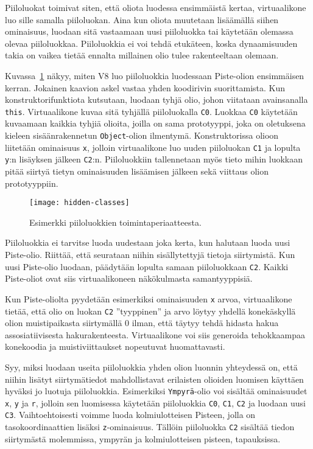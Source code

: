 Piiloluokat toimivat siten, että oliota luodessa ensimmäistä kertaa, virtuaalikone luo sille samalla piiloluokan. Aina kun oliota muutetaan lisäämällä siihen ominaisuus, luodaan sitä vastaamaan uusi piiloluokka tai käytetään olemassa olevaa piiloluokkaa. Piiloluokkia ei voi tehdä etukäteen, koska dynaamisuuden takia on vaikea tietää ennalta millainen olio tulee rakenteeltaan olemaan. 

Kuvassa~\ref{fig:hiddenclass} näkyy, miten V8 luo piiloluokkia luodessaan Piste-olion ensimmäisen kerran. Jokainen kaavion askel vastaa yhden koodirivin suorittamista. Kun konstruktorifunktiota kutsutaan, luodaan tyhjä olio, johon viitataan avainsanalla \texttt{this}. Virtuaalikone kuvaa sitä tyhjällä piiloluokalla \texttt{C0}. Luokkaa \texttt{C0} käytetään kuvaamaan kaikkia tyhjiä olioita, joilla on sama prototyyppi, joka on oletuksena kieleen sisäänrakennetun \texttt{Object}-olion ilmentymä. Konstruktorissa olioon liitetään ominaisuus \texttt{x}, jolloin virtuaalikone luo uuden piiloluokan \texttt{C1} ja lopulta \texttt{y}:n lisäyksen jälkeen \texttt{C2}:n. Piiloluokkiin tallennetaan myös tieto mihin luokkaan pitää siirtyä tietyn ominaisuuden lisäämisen jälkeen sekä viittaus olion prototyyppiin.

\begin{figure}[ht]
    \texttt{[image: hidden-classes]}
    \caption{Esimerkki piiloluokkien toimintaperiaatteesta.}
     \centering
     \label{fig:hiddenclass}
\end{figure}

Piiloluokkia ei tarvitse luoda uudestaan joka kerta, kun halutaan luoda uusi Piste-olio. Riittää, että seurataan niihin sisällytettyjä tietoja siirtymistä. Kun uusi Piste-olio luodaan, päädytään lopulta samaan piiloluokkaan \texttt{C2}. Kaikki Piste-oliot ovat siis virtuaalikoneen näkökulmasta samantyyppisiä.

Kun Piste-oliolta pyydetään esimerkiksi ominaisuuden \texttt{x} arvoa, virtuaalikone tietää, että olio on luokan \texttt{C2} ''tyyppinen'' ja arvo löytyy yhdellä konekäskyllä olion muistipaikasta siirtymällä 0 ilman, että täytyy tehdä hidasta hakua assosiatiivisesta hakurakenteesta. Virtuaalikone voi siis generoida tehokkaampaa konekoodia ja muistiviittaukset nopeutuvat huomattavasti.

Syy, miksi luodaan useita piiloluokkia yhden olion luonnin yhteydessä on, että niihin lisätyt siirtymätiedot mahdollistavat erilaisten olioiden luomisen käyttäen hyväksi jo luotuja piiloluokkia. Esimerkiksi \texttt{Ympyrä}-olio voi sisältää ominaisuudet \texttt{x}, \texttt{y} ja \texttt{r}, jolloin sen luomisessa käytetään piiloluokkia \texttt{C0}, \texttt{C1}, \texttt{C2} ja luodaan uusi \texttt{C3}. Vaihtoehtoisesti voimme luoda kolmiulotteisen Pisteen, jolla on tasokoordinaattien lisäksi \texttt{z}-ominaisuus. Tällöin piiloluokka \texttt{C2} sisältää tiedon siirtymästä molemmissa, ympyrän ja kolmiulotteisen pisteen, tapauksissa.

